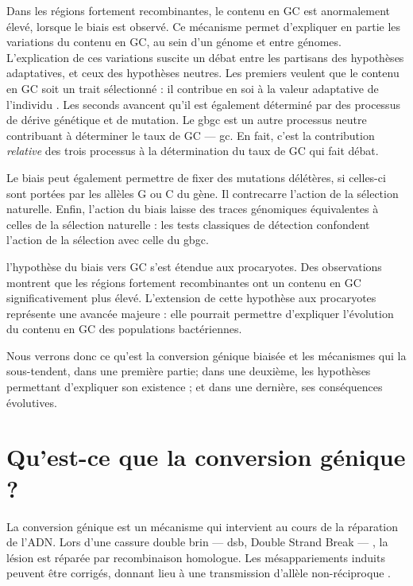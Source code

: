 \documentclass[11pt, oneside]{scrartcl}
\begin{document}
Dans les régions fortement recombinantes, le contenu en GC est anormalement
élevé, lorsque le biais est observé\cite{duret_impact_2008}. Ce mécanisme permet
d'expliquer en partie les variations du contenu en GC, au sein d'un génome et
entre génomes. L'explication de ces variations suscite un débat entre les
partisans des hypothèses adaptatives, et ceux des hypothèses neutres. Les
premiers veulent que le contenu en GC soit un trait sélectionné : il contribue
en soi à la valeur adaptative de l'individu \cite{hildebrand_evidence_2010}. Les
seconds avancent qu'il est également déterminé par des processus de dérive
génétique et de mutation. Le \ac{gbgc} est un autre processus neutre contribuant
à déterminer le taux de GC --- \ac{gc}. En fait, c'est la contribution
\emph{relative} des trois processus à la détermination du taux de GC qui fait débat.

Le biais peut également permettre de fixer des mutations délétères, si celles-ci
sont portées par les allèles G ou C du gène. Il contrecarre l'action de la
sélection naturelle\cite{galtier_gc-biased_2009, galtier_adaptation_2007}.
Enfin, l'action du biais laisse des traces génomiques équivalentes à celles de
la sélection naturelle : les tests classiques de détection confondent l'action
de la sélection avec celle du \ac{gbgc}\cite{ratnakumar_detecting_2010}.

 l'hypothèse du biais vers GC s'est étendue aux
procaryotes\cite{lassalle_gc-content_2015}. Des observations montrent que les
régions fortement recombinantes ont un contenu en GC significativement plus
élevé. L'extension de cette hypothèse aux procaryotes représente une avancée
majeure : elle pourrait permettre d'expliquer l'évolution du contenu en GC des
populations bactériennes.

Nous verrons donc ce qu'est la conversion génique biaisée et les mécanismes qui
la sous-tendent, dans une première partie; dans une deuxième, les hypothèses
permettant d'expliquer son existence ; et dans une dernière, ses conséquences
évolutives.

\section{Qu'est-ce que la conversion génique ?}
\label{sec:orgheadline8}

La conversion génique est un mécanisme qui intervient au cours de la réparation
de l'ADN. Lors d'une cassure double brin --- \ac{dsb}, Double Strand Break --- ,
la lésion est réparée par recombinaison homologue. Les mésappariements induits
peuvent être corrigés, donnant lieu à une transmission d'allèle non-réciproque
\cite{chen_mechanism_2008}.
\end{document}

